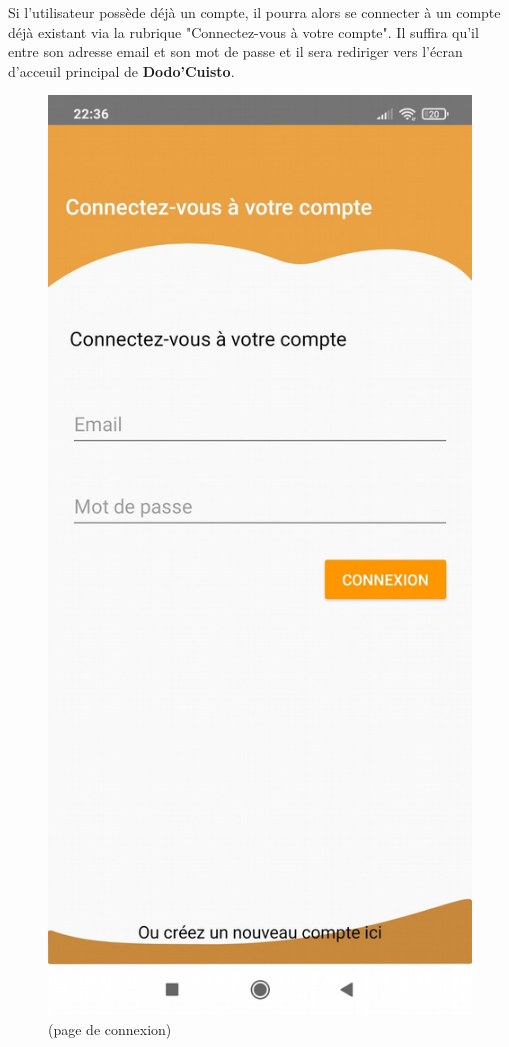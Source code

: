 \documentclass{article}
\begin{document}
Si l’utilisateur possède déjà un compte, il pourra alors se connecter à un compte déjà existant via la rubrique "Connectez-vous à votre compte". Il suffira qu’il entre son adresse email et son mot de passe et il sera rediriger vers l’écran d’acceuil principal de \textbf{Dodo’Cuisto}.\\

\begin{figure}
    \center
    \includegraphics[scale=0.15]{connexion.png}
    \caption{(page de connexion)}
\end{figure}
\end{document}
